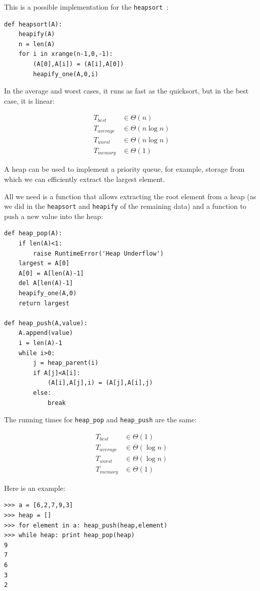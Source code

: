 \documentclass[justified,sixbynine]{tufte-book}
\def\ft{\small\tt}
\theoremstyle{plain}%
\theoremstyle{definition}
\theoremstyle{remark}
\begin{document}
\begin{fullwidth}
This is a possible implementation for the {\ft heapsort}~\cite{heapsort}:

\begin{lstlisting}
def heapsort(A):
    heapify(A)
    n = len(A)
    for i in xrange(n-1,0,-1):
        (A[0],A[i]) = (A[i],A[0])
        heapify_one(A,0,i)
\end{lstlisting}

In the average and worst cases, it runs as fast as the quicksort, but in the best case, it is linear:

\begin{align}
T_{best} &\in \Theta (n) \\
T_{average} &\in \Theta (n\log n) \\
T_{worst} &\in \Theta (n\log n) \\
T_{memory} &\in \Theta (1)
\end{align}


A heap can be used to implement a priority queue, for example, storage from which we can efficiently extract the largest element.

All we need is a function that allows extracting the root element from a heap (as we did in the {\ft heapsort} and {\ft heapify} of the remaining data) and a function to push a new value into the heap:

\begin{lstlisting}
def heap_pop(A):
    if len(A)<1:
        raise RuntimeError('Heap Underflow')
    largest = A[0]
    A[0] = A[len(A)-1]
    del A[len(A)-1]
    heapify_one(A,0)
    return largest

def heap_push(A,value):
    A.append(value)
    i = len(A)-1
    while i>0:
        j = heap_parent(i)
        if A[j]<A[i]:
            (A[i],A[j],i) = (A[j],A[i],j)
        else:
            break
\end{lstlisting}

The running times for {\ft heap\_pop} and {\ft heap\_push} are the same:

\begin{align}
T_{best} &\in \Theta (1) \\
T_{average} &\in \Theta (\log n) \\
T_{worst} &\in \Theta (\log n) \\
T_{memory} &\in \Theta (1)
\end{align}

Here is an example:

\begin{lstlisting}
>>> a = [6,2,7,9,3]
>>> heap = []
>>> for element in a: heap_push(heap,element)
>>> while heap: print heap_pop(heap)
9
7
6
3
2
\end{lstlisting}


\end{fullwidth}
\end{document}
